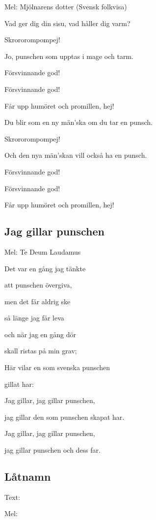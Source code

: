 Mel: Mjölnarens dotter (Svensk folkvisa)\bigskip


Vad ger dig din sisu, vad håller dig varm?

Skrororompompej!

Jo, punschen som upptas i mage och tarm.

Försvinnande god!

Försvinnande god!

Får upp humöret och promillen, hej!\bigskip

Du blir som en ny män’ska om du tar en punsch.

Skrororompompej!

Och den nya män’skan vill också ha en punsch.

Försvinnande god!

Försvinnande god!

Får upp humöret och promillen, hej!

\subsection{\textbf{Jag gillar punschen}}

Mel: Te Deum Laudamus\bigskip


Det var en gång jag tänkte

att punschen övergiva,

men det får aldrig ske

så länge jag får leva

och när jag en gång dör

skall ristas på min grav;

Här vilar en som svenska punschen

gillat har:\bigskip

Jag gillar, jag gillar punschen,

jag gillar den som punschen skapat har.

Jag gillar, jag gillar punschen,

jag gillar punschen och dess far.

\subsection{\textbf{Låtnamn}}

Text: 

Mel: \bigskip

\newpage